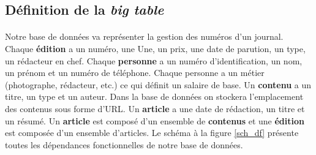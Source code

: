 \subsection{Définition de la \textit{big table}}

\paragraph{}{
    Notre base de données va représenter la gestion des numéros d'un journal. Chaque \textbf{édition} a un numéro, une Une, un prix, une date de parution, un type, un rédacteur en chef. Chaque \textbf{personne} a un numéro d'identification, un nom, un prénom et un numéro de téléphone. Chaque personne a un métier (photographe, rédacteur, etc.) ce qui définit un salaire de base. Un \textbf{contenu} a un titre, un type et un auteur. Dans la base de données on stockera l'emplacement des contenus sous forme d'URL. Un \textbf{article} a une date de rédaction, un titre et un résumé. Un \textbf{article} est composé d'un ensemble de \textbf{contenus} et une \textbf{édition} est composée d'un ensemble d'articles. \newline
    Le schéma à la figure \ref{sch_df} présente toutes les dépendances fonctionnelles de notre base de données.
}